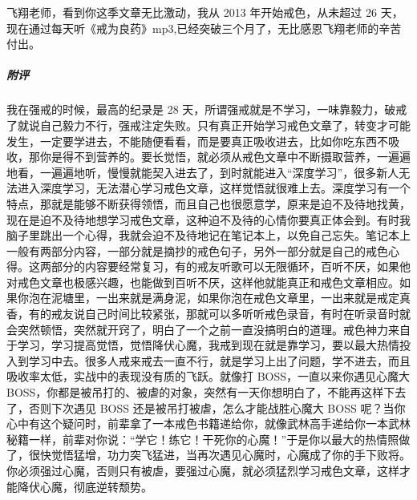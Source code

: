 \begin{case}
    飞翔老师，看到你这季文章无比激动，我从 2013 年开始戒色，从未超过 26 天，现在通过每天听《戒为良药》mp3,已经突破三个月了，无比感恩飞翔老师的辛苦付出。
    \subparagraph{附评} 我在强戒的时候，最高的纪录是 28 天，所谓强戒就是不学习，一味靠毅力，破戒了就说自己毅力不行，强戒注定失败。只有真正开始学习戒色文章了，转变才可能发生，一定要学进去，不能随便看看，而是要真正吸收进去，比如你吃东西不吸收，那你是得不到营养的。要长觉悟，就必须从戒色文章中不断摄取营养，一遍遍地看，一遍遍地听，慢慢就能契入进去了，到时就能进入“深度学习”，很多新人无法进入深度学习，无法潜心学习戒色文章，这样觉悟就很难上去。深度学习有一个特点，那就是能够不断获得领悟，而且自己也很愿意学，原来是迫不及待地找黄，现在是迫不及待地想学习戒色文章，这种迫不及待的心情你要真正体会到。有时我脑子里跳出一个心得，我就会迫不及待地记在笔记本上，以免自己忘失。笔记本上一般有两部分内容，一部分就是摘抄的戒色句子，另外一部分就是自己的戒色心得。这两部分的内容要经常复习，有的戒友听歌可以无限循环，百听不厌，如果他对戒色文章也极感兴趣，也能做到百听不厌，这样他就能真正和戒色文章相应。如果你泡在泥塘里，一出来就是满身泥，如果你泡在戒色文章里，一出来就是戒定真香，有的戒友说自己时间比较紧张，那就可以多听听戒色录音，有时在听录音时就会突然顿悟，突然就开窍了，明白了一个之前一直没搞明白的道理。戒色神力来自于学习，学习提高觉悟，觉悟降伏心魔，我戒到现在就是靠学习，要以最大热情投入到学习中去。很多人戒来戒去一直不行，就是学习上出了问题，学不进去，而且吸收率太低，实战中的表现没有质的飞跃。就像打 BOSS，一直以来你遇见心魔大 BOSS，你都是被吊打的、被虐的对象，突然有一天你想明白了，不能再这样下去了，否则下次遇见 BOSS 还是被吊打被虐，怎么才能战胜心魔大 BOSS 呢？当你心中有这个疑问时，前辈拿了一本戒色书籍递给你，就像武林高手递给你一本武林秘籍一样，前辈对你说：“学它！练它！干死你的心魔！”于是你以最大的热情照做了，很快觉悟猛增，功力突飞猛进，当再次遇见心魔时，心魔成了你的手下败将。你必须强过心魔，否则只有被虐，要强过心魔，就必须猛烈学习戒色文章，这样才能降伏心魔，彻底逆转颓势。
\end{case}

